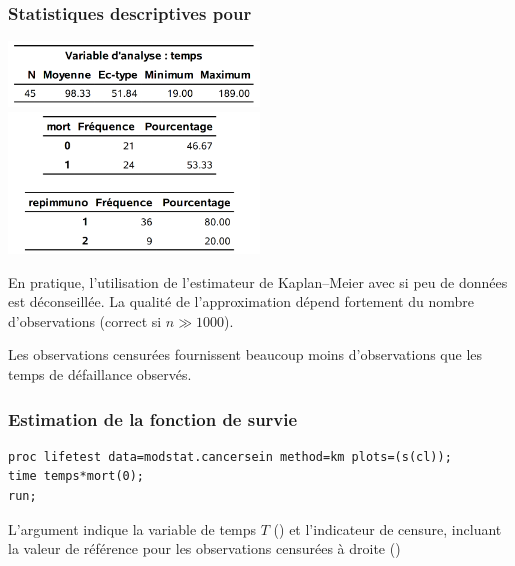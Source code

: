 \documentclass{beamer}
\begin{document}
\begin{frame}
\frametitle{Statistiques descriptives pour }
\begin{center}
\includegraphics[width = 0.5\textwidth]{img/c7/diapos7e01}
\includegraphics[width = 0.5\textwidth]{img/c7/diapos7e02}
\end{center}
{
\footnotesize En pratique, l'utilisation de l'estimateur de Kaplan--Meier avec si peu de données est déconseillée. La qualité de l'approximation dépend fortement du nombre d'observations (correct si $n \gg 1000$).

Les observations censurées fournissent beaucoup moins d'observations que les temps de défaillance observés.

}
\end{frame}


\begin{frame}[fragile]
\frametitle{Estimation de la fonction de survie }

\begin{tcolorbox}[colback=white,colframe=hecblue,title=Code \SASlang{} pour ajuster l'estimateur de Kaplan--Meier]
{\footnotesize 
\begin{verbatim}
proc lifetest data=modstat.cancersein method=km plots=(s(cl));
time temps*mort(0);
run;
\end{verbatim}
}
\end{tcolorbox}
{ \footnotesize 
L'argument  indique la variable de temps $T$ () et l'indicateur de censure,  incluant la valeur de référence pour les observations censurées à droite ()

}
\end{frame}
\end{document}
